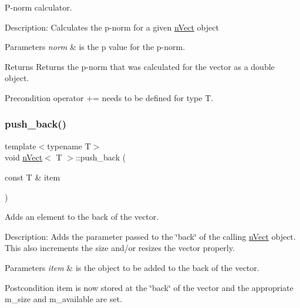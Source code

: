 P-\/norm calculator. 

Description\+: Calculates the p-\/norm for a given \hyperlink{classnVect}{n\+Vect} object 
\begin{DoxyParams}{Parameters}
{\em norm} & is the p value for the p-\/norm. \\
\hline
\end{DoxyParams}
\begin{DoxyReturn}{Returns}
Returns the p-\/norm that was calculated for the vector as a double object. 
\end{DoxyReturn}
\begin{DoxyPrecond}{Precondition}
operator += needs to be defined for type T. 
\end{DoxyPrecond}
\mbox{\label{classnVect_aac4b9c9287c14f0957f46eec00f17e62}} 
\subsubsection{\texorpdfstring{push\+\_\+back()}{push\_back()}}
{\footnotesize\ttfamily template$<$typename T$>$ \\
void \hyperlink{classnVect}{n\+Vect}$<$ T $>$\+::push\+\_\+back (\begin{DoxyParamCaption}\item[{const T \&}]{item }\end{DoxyParamCaption})}



Adds an element to the back of the vector. 

Description\+: Adds the parameter passed to the \char`\"{}back\char`\"{} of the calling \hyperlink{classnVect}{n\+Vect} object. This also increments the size and/or resizes the vector properly. 
\begin{DoxyParams}{Parameters}
{\em item} & is the object to be added to the back of the vector. \\
\hline
\end{DoxyParams}
\begin{DoxyPostcond}{Postcondition}
item is now stored at the \char`\"{}back\char`\"{} of the vector and the appropriate m\+\_\+size and m\+\_\+available are set. 
\end{DoxyPostcond}
\mbox{\label{classnVect_a5d998eac73178b38c0e24a6aa29eacbb}} 
